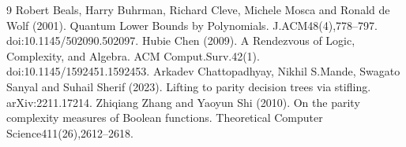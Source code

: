 \begin{thebibliography}{9}
 Robert Beals, Harry Buhrman, Richard Cleve, Michele Mosca and Ronald de Wolf (2001). Quantum Lower Bounds by Polynomials. J.ACM48(4),778--797. doi:10.1145/502090.502097.
 Hubie Chen (2009). A Rendezvous of Logic, Complexity, and Algebra. ACM Comput.Surv.42(1). doi:10.1145/1592451.1592453.
 Arkadev Chattopadhyay, Nikhil S.Mande, Swagato Sanyal and Suhail Sherif (2023). Lifting to parity decision trees via stifling. arXiv:2211.17214.
 Zhiqiang Zhang and Yaoyun Shi (2010). On the parity complexity measures of Boolean functions. Theoretical Computer Science411(26),2612--2618.
\end{thebibliography}
